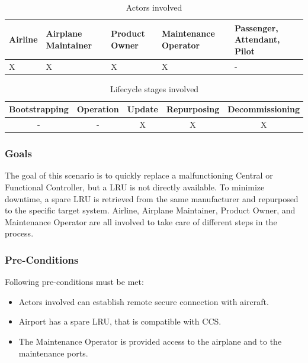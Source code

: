 \begin{table}
	\caption{Actors involved}
	\label{tab:Actors involved}
	\begin{center}
		\begin{tabular}{ |p{2.5cm}|p{2.5cm}|p{2.5cm}|p{2.5cm}|p{2.5cm}| }
			\hline
			Airline & Airplane Maintainer & Product Owner & Maintenance Operator & Passenger, Attendant, Pilot \\
			\hline
			X       & X                   & X             & X                    & -                           \\
			\hline
		\end{tabular}
	\end{center}
\end{table}

\begin{table}
	\caption{Lifecycle stages involved}
	\label{tab:Lifecycle stages involved}
	\begin{center}
		\begin{tabular}{ |c|c|c|c|c| }
			\hline
			Bootstrapping & Operation & Update & Repurposing & Decommissioning \\
			\hline
			-             & -         & X      & X           & X               \\
			\hline
		\end{tabular}
	\end{center}
\end{table}

\subsubsection{Goals}

The goal of this scenario is to quickly replace a malfunctioning Central or Functional Controller, but a LRU is not
directly available. To minimize downtime, a spare LRU is retrieved from the same manufacturer and repurposed to the
specific target system. Airline, Airplane Maintainer, Product Owner, and Maintenance Operator are all involved to take
care of different steps in the process.

\subsubsection{Pre-Conditions}

Following pre-conditions must be met:

\begin{itemize}
	\item Actors involved can establish remote secure connection with aircraft.
	\item Airport has a spare LRU, that is compatible with CCS.
	\item The Maintenance Operator is provided access to the airplane and to the maintenance ports.
\end{itemize}

